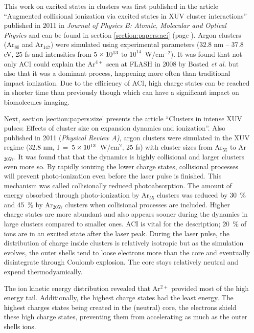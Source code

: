 This work on excited states in clusters was first published in the article
``Augmented collisional ionization via excited states in XUV cluster
interactions'' published in 2011 in \textit{Journal of Physics B: Atomic,
Molecular and Optical Physics} and can be found in section
\ref{section:papers:aci} (page \pageref{section:papers:aci}). Argon clusters
(Ar$_{80}$ and Ar$_{147}$) were simulated using experimental parameters
(32.8 nm -- 37.8 eV, 25 fs and intensities from $\ten{5}{13}$ to
$10^{14}$~W/cm$^{-2}$). It was found that not only ACI could explain the
Ar$^{4+}$ seen at FLASH in 2008 by Bosted \textit{et al.} but also that it
was a dominant process, happening more often than traditional impact ionization.
Due to the efficiency of ACI, high charge states can be reached in shorter time
than previously though which can have a significant impact on biomolecules
imaging.



Next, section \ref{section:papers:size} presents the article ``Clusters in
intense XUV pulses: Effects of cluster size on expansion dynamics and
ionization''. Also published in 2011 (\textit{Physical Review A)}, argon
clusters were simulated in the XUV regime (32.8 nm,
I~=~$\ten{5}{13}$~W/cm$^{2}$, 25 fs) with cluster sizes from Ar$_{55}$ to
Ar$_{2057}$. It was found that that the dynamics is highly collisional and
larger clusters even more so. By rapidly ionizing the lower charge states,
collisional processes will prevent photo-ionization even before the laser pulse
is finished. This mechanism was called collisionally reduced photoabsorption.
The amount of energy absorbed through photo-ionization by Ar$_{55}$ clusters was
reduced by 30~\% and 45~\% by Ar$_{2057}$ clusters when collisional processes
are included.
Higher charge states are more abundant and also appears sooner during the
dynamics in large clusters compared to smaller ones. ACI is vital for the
description; 20~\% of ions are in an excited state after the laser peak.
During the laser pulse, the distribution of charge inside clusters is
relatively isotropic but as the simulation evolves, the outer shells tend to
loose electrons more than the core and eventually disintegrate through Coulomb
explosion.
The core stays relatively neutral and expend thermodyamically.

The ion kinetic energy distribution revealed that Ar$^{2+}$  provided most of
the high energy tail. Additionally, the highest charge states had the least
energy. The highest charges states being created in the (neutral) core, the
electrons shield these high charge states, preventing them from accelerating
as much as the outer shells ions.

